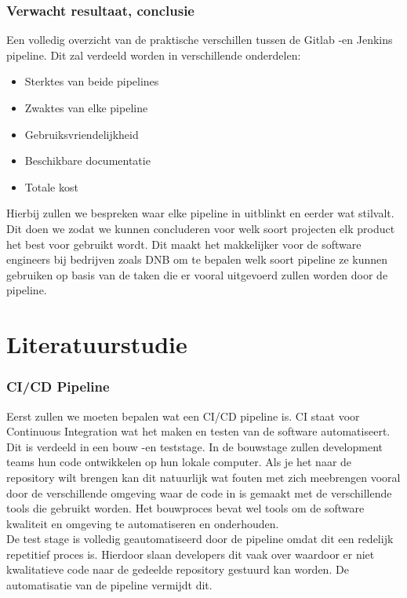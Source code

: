 \section{Verwacht resultaat, conclusie}%
\label{sec:verwachte_resultaten}
Een volledig overzicht van de praktische verschillen tussen de Gitlab -en Jenkins pipeline. Dit zal verdeeld worden in verschillende onderdelen:

\begin{itemize}
    \item Sterktes van beide pipelines
    \item Zwaktes van elke pipeline
    \item Gebruiksvriendelijkheid
    \item Beschikbare documentatie
    \item Totale kost
\end{itemize}

Hierbij zullen we bespreken waar elke pipeline in uitblinkt en eerder wat stilvalt. Dit doen we zodat we kunnen concluderen voor welk soort projecten elk product het best voor gebruikt wordt. Dit maakt het makkelijker voor de software engineers bij bedrijven zoals DNB om te bepalen welk soort pipeline ze kunnen gebruiken op basis van de taken die er vooral uitgevoerd zullen worden door de pipeline. 


\part{Literatuurstudie}
\section{CI/CD Pipeline}
Eerst zullen we moeten bepalen wat een CI/CD pipeline is. CI staat voor Continuous Integration wat het maken en testen van de software automatiseert. Dit is verdeeld in een bouw -en teststage. In de bouwstage zullen development teams hun code ontwikkelen op hun lokale computer. Als je het naar de repository wilt brengen kan dit natuurlijk wat fouten met zich meebrengen vooral door de verschillende omgeving waar de code in is gemaakt met de verschillende tools die gebruikt worden. Het bouwproces bevat wel tools om de software kwaliteit en omgeving te automatiseren en onderhouden. \autocite{Fosco2022} \\

De test stage is volledig geautomatiseerd door de pipeline omdat dit een redelijk repetitief proces is. Hierdoor slaan developers dit vaak over waardoor er niet kwalitatieve code naar de gedeelde repository gestuurd kan worden. De automatisatie van de pipeline vermijdt dit. \autocite{Fosco2022} \\

